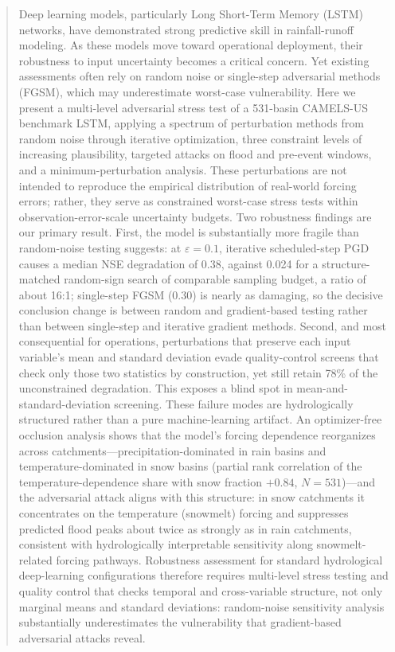 \documentclass[final]{agujournal2019}
\begin{document}
\begin{abstract}
Deep learning models, particularly Long Short-Term Memory (LSTM) networks, have demonstrated strong predictive skill in rainfall-runoff modeling. As these models move toward operational deployment, their robustness to input uncertainty becomes a critical concern. Yet existing assessments often rely on random noise or single-step adversarial methods (FGSM), which may underestimate worst-case vulnerability. Here we present a multi-level adversarial stress test of a 531-basin CAMELS-US benchmark LSTM, applying a spectrum of perturbation methods from random noise through iterative optimization, three constraint levels of increasing plausibility, targeted attacks on flood and pre-event windows, and a minimum-perturbation analysis. These perturbations are not intended to reproduce the empirical distribution of real-world forcing errors; rather, they serve as constrained worst-case stress tests within observation-error-scale uncertainty budgets. Two robustness findings are our primary result. First, the model is substantially more fragile than random-noise testing suggests: at $\varepsilon = 0.1$, iterative scheduled-step PGD causes a median NSE degradation of 0.38, against 0.024 for a structure-matched random-sign search of comparable sampling budget, a ratio of about 16:1; single-step FGSM (0.30) is nearly as damaging, so the decisive conclusion change is between random and gradient-based testing rather than between single-step and iterative gradient methods. Second, and most consequential for operations, perturbations that preserve each input variable's mean and standard deviation evade quality-control screens that check only those two statistics by construction, yet still retain 78\% of the unconstrained degradation. This exposes a blind spot in mean-and-standard-deviation screening. These failure modes are hydrologically structured rather than a pure machine-learning artifact. An optimizer-free occlusion analysis shows that the model's forcing dependence reorganizes across catchments---precipitation-dominated in rain basins and temperature-dominated in snow basins (partial rank correlation of the temperature-dependence share with snow fraction $+0.84$, $N = 531$)---and the adversarial attack aligns with this structure: in snow catchments it concentrates on the temperature (snowmelt) forcing and suppresses predicted flood peaks about twice as strongly as in rain catchments, consistent with hydrologically interpretable sensitivity along snowmelt-related forcing pathways. Robustness assessment for standard hydrological deep-learning configurations therefore requires multi-level stress testing and quality control that checks temporal and cross-variable structure, not only marginal means and standard deviations: random-noise sensitivity analysis substantially underestimates the vulnerability that gradient-based adversarial attacks reveal.
\end{abstract}
\end{document}
